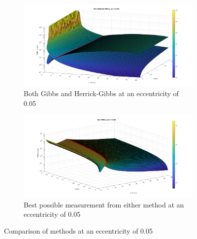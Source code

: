\documentclass[12pt]{article}
\begin{document}
\begin{figure}[H]
	\centering
	\begin{subfigure}{.5\textwidth}
		\centering
		\includegraphics[width=1.1\textwidth]{bothMethods_e_05}
		\caption{Both Gibbs and Herrick-Gibbs at an eccentricity of 0.05}
		\label{fig:sub1}
	\end{subfigure}%
	\begin{subfigure}{.5\textwidth}
		\centering
		\includegraphics[width=1.1\linewidth]{bestMethods_e_05}
		\caption{Best possible measurement from either method at an eccentricity of 0.05}
		\label{fig:sub2}
	\end{subfigure}
	\caption{Comparison of methods at an eccentricity of 0.05}
	\label{fig:test}
\end{figure}
\end{document}
